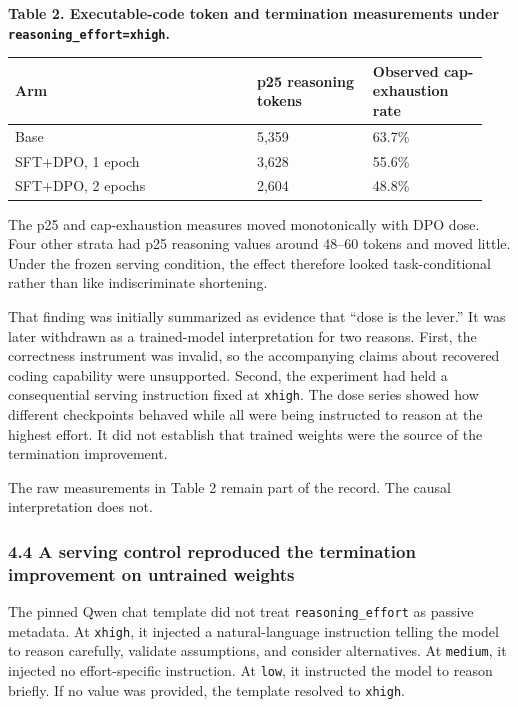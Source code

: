 \documentclass[
  9pt,
  letterpaper,
]{article}
\begin{document}
\textbf{Table 2. Executable-code token and termination measurements
under \texttt{reasoning\_effort=xhigh}.}

\begin{longtable}[]{@{}p{0.48\linewidth}p{0.23\linewidth}p{0.23\linewidth}@{}}
\toprule\noalign{}
Arm & p25 reasoning tokens & Observed cap-exhaustion rate \\
\midrule\noalign{}
\endhead
\bottomrule\noalign{}
\endlastfoot
Base & 5,359 & 63.7\% \\
SFT+DPO, 1 epoch & 3,628 & 55.6\% \\
SFT+DPO, 2 epochs & 2,604 & 48.8\% \\
\end{longtable}

The p25 and cap-exhaustion measures moved monotonically with DPO dose.
Four other strata had p25 reasoning values around 48--60 tokens and
moved little. Under the frozen serving condition, the effect therefore
looked task-conditional rather than like indiscriminate shortening.

That finding was initially summarized as evidence that ``dose is the
lever.'' It was later withdrawn as a trained-model interpretation for
two reasons. First, the correctness instrument was invalid, so the
accompanying claims about recovered coding capability were unsupported.
Second, the experiment had held a consequential serving instruction
fixed at \texttt{xhigh}. The dose series showed how different
checkpoints behaved while all were being instructed to reason at the
highest effort. It did not establish that trained weights were the
source of the termination improvement.

The raw measurements in Table 2 remain part of the record. The causal
interpretation does not.

\hypertarget{44-a-serving-control-reproduced-the-termination-improvement-on-untrained-weights}{%
\subsubsection{4.4 A serving control reproduced the termination
improvement on untrained
weights}\label{44-a-serving-control-reproduced-the-termination-improvement-on-untrained-weights}}

The pinned Qwen chat template did not treat \texttt{reasoning\_effort}
as passive metadata. At \texttt{xhigh}, it injected a natural-language
instruction telling the model to reason carefully, validate assumptions,
and consider alternatives. At \texttt{medium}, it injected no
effort-specific instruction. At \texttt{low}, it instructed the model to
reason briefly. If no value was provided, the template resolved to
\texttt{xhigh}.
\end{document}
